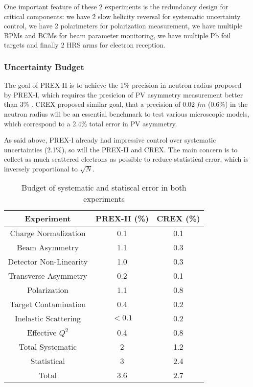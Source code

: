 One important feature of these 2 experiments is the redundancy design for critical
components: we have 2 slow helicity reversal for systematic uncertainty control,
we have 2 polarimeters for polarization measurement, we have multiple BPMs and
BCMs for beam parameter monitoring, we have multiple Pb foil targets and finally
2 HRS arms for electron reception.

\subsubsection{Uncertainty Budget}
The goal of PREX-II is to achieve the 1\% precision in \Pb neutron radius proposed
by PREX-I, which requires the presicion of PV asymmetry measurement better than 3\% \cite{PhysRevLett.106.252501}. 
CREX proposed similar goal, that a precision of $0.02 \ fm$ (0.6\%) in the
\Ca neutron radius will be an essential benchmark to test various microscopic 
models, which correspond to a 2.4\% total error in PV asymmetry.

As said above, PREX-I already had impressive control over systematic uncertainties (2.1\%),
so will the PREX-II and CREX. The main concern is to collect as much scattered 
electrons as possible to reduce statistical error, which is inversely 
proportional to $\sqrt{N}$.
\begin{table}
    \centering
    \begin{tabular}{c| c c}
	\hline
	Experiment  & PREX-II (\%)	& CREX (\%)	\\
	\hline
	Charge Normalization	& 0.1	& 0.1	\\
	Beam Asymmetry		& 1.1	& 0.3	\\
	Detector Non-Linearity	& 1.0	& 0.3	\\
	Transverse Asymmetry	& 0.2	& 0.1	\\
	Polarization		& 1.1	& 0.8	\\
	Target Contamination	& 0.4	& 0.2	\\
	Inelastic Scattering	& $<0.1$    & 0.2   \\
	Effective $Q^2$		& 0.4	& 0.8	\\
	\hline
	Total Systematic	& 2	& 1.2	\\
	Statistical		& 3	& 2.4	\\
	\hline
	Total			& 3.6	& 2.7	\\
	\hline
    \end{tabular}
    \caption{Budget of systematic and statiscal error in both experiments 
    \cite{prex-II_proposal, crex_proposal}
    }
\end{table}

